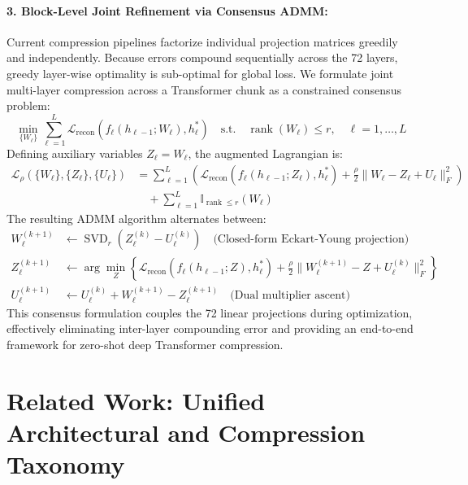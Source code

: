 \documentclass{article}
\begin{document}
\paragraph{3. Block-Level Joint Refinement via Consensus ADMM:}
Current compression pipelines factorize individual projection matrices greedily and independently. Because errors compound sequentially across the 72 layers, greedy layer-wise optimality is sub-optimal for global loss. We formulate joint multi-layer compression across a Transformer chunk as a constrained consensus problem:
\begin{equation}
    \min_{\{W_\ell\}} \sum_{\ell=1}^L \mathcal{L}_{\text{recon}}\left(f_\ell(h_{\ell-1}; W_\ell), h_\ell^*\right) \quad \text{s.t.} \quad \operatorname{rank}(W_\ell) \le r, \quad \ell = 1, \dots, L
\end{equation}
Defining auxiliary variables $Z_\ell = W_\ell$, the augmented Lagrangian is:
\begin{equation}
\begin{split}
    \mathcal{L}_{\rho}\left(\{W_\ell\}, \{Z_\ell\}, \{U_\ell\}\right) &= \sum_{\ell=1}^L \left( \mathcal{L}_{\text{recon}}\left(f_\ell(h_{\ell-1}; Z_\ell), h_\ell^*\right) + \frac{\rho}{2} \|W_\ell - Z_\ell + U_\ell\|_F^2 \right) \\
    &\quad + \sum_{\ell=1}^L \mathbb{I}_{\operatorname{rank} \le r}(W_\ell)
\end{split}
\end{equation}
The resulting ADMM algorithm alternates between:
\begin{align}
    W_\ell^{(k+1)} &\leftarrow \operatorname{SVD}_r\left(Z_\ell^{(k)} - U_\ell^{(k)}\right) \quad \text{(Closed-form Eckart-Young projection)} \\
    Z_\ell^{(k+1)} &\leftarrow \arg\min_{Z} \left\{ \mathcal{L}_{\text{recon}}\left(f_\ell(h_{\ell-1}; Z), h_\ell^*\right) + \frac{\rho}{2} \|W_\ell^{(k+1)} - Z + U_\ell^{(k)}\|_F^2 \right\} \\
    U_\ell^{(k+1)} &\leftarrow U_\ell^{(k)} + W_\ell^{(k+1)} - Z_\ell^{(k+1)} \quad \text{(Dual multiplier ascent)}
\end{align}
This consensus formulation couples the 72 linear projections during optimization, effectively eliminating inter-layer compounding error and providing an end-to-end framework for zero-shot deep Transformer compression.

\section{Related Work: Unified Architectural and Compression Taxonomy}
\label{sec:taxonomy}
\end{document}
